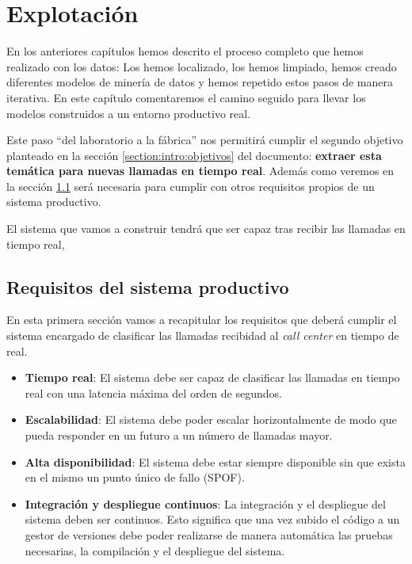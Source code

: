 \chapter{Explotación}
En los anteriores capítulos hemos descrito el proceso completo que hemos realizado con los datos: Los hemos localizado, los hemos limpiado, hemos creado diferentes modelos de minería de datos y hemos repetido estos pasos de manera iterativa. En este capítulo comentaremos el camino seguido para llevar los modelos construidos a un entorno productivo real.

Este paso ``del laboratorio a la fábrica'' nos permitirá  cumplir el segundo objetivo planteado en la sección \ref{section:intro:objetivos} del documento: \textbf{extraer esta temática para nuevas llamadas en tiempo real}. Además como veremos en la sección \ref{section:prod:req} será necesaria para cumplir con otros requisitos propios de un sistema productivo.

El sistema que vamos a construir tendrá que ser capaz tras recibir las llamadas en tiempo real, 



\section{Requisitos del sistema productivo}
\label{section:prod:req}

En esta primera sección vamos a recapitular los requisitos que deberá cumplir el sistema encargado de clasificar las llamadas recibidad al \textit{call center} en tiempo de real. 

\begin{itemize}
	\item \textbf{Tiempo real}: El sistema debe ser capaz de clasificar las llamadas en tiempo real con una latencia máxima del orden de segundos. 
	\item \textbf{Escalabilidad}: El sistema debe poder escalar horizontalmente de modo que pueda responder en un futuro a un número de llamadas mayor. 
	\item \textbf{Alta disponibilidad}: El sistema debe estar siempre disponible sin que exista en el mismo un punto único de fallo (SPOF).
	\item \textbf{Integración y despliegue continuos}: La integración y el despliegue del sistema deben ser continuos. Esto significa que una vez subido el código a un gestor de versiones debe poder realizarse de manera automática las pruebas necesarias, la compilación y el despliegue del sistema.
	
\end{itemize}

